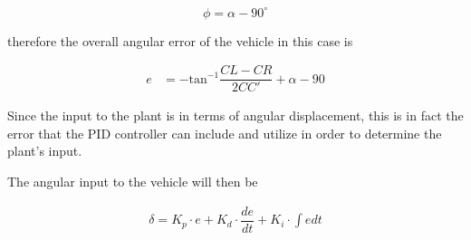 $$\phi = \alpha - 90^{\circ}$$


therefore the overall angular error of the vehicle in this case is

\begin{align}
  e &= -\text{tan}^{-1}\dfrac{CL-CR}{2CC'} + \alpha - 90
\end{align}



Since the input to the plant is in terms of angular displacement, this
is in fact the error that the PID controller can include and utilize in
order to determine the plant's input.

The angular input to the vehicle will then be

\begin{align}
  \delta = K_p \cdot e + K_d \cdot \dfrac{de}{dt} + K_i \cdot \int e dt
\end{align}
